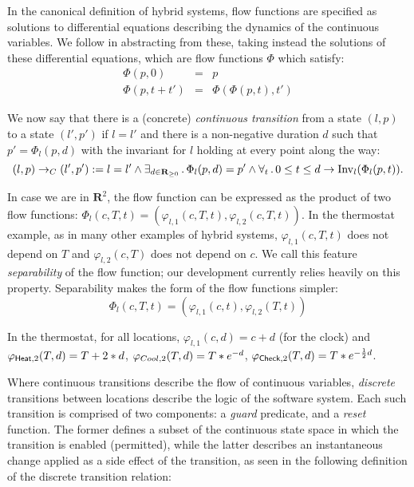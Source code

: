 \documentclass[runningheads]{llncs}
\newcommand{\Exists}[2]{\exists_{#1} \, . \, #2}
\newcommand{\Forall}[2]{\forall_{#1} \, . \, #2}
\def\phi{\varphi}
\newcommand{\weg}[1]{}
\newcommand{\IR}{{\mathbf R}}
\newcommand{\Heat}{{\sf Heat}}
\newcommand{\Cool}{{\sf Cool}}
\newcommand{\Chec}{{\sf Check}}
\newcommand{\Inv}{{\rm Inv}}
\newcommand{\contrans}{\rightarrow_C}
\newcommand{\Dur}{{\IR_{\geq 0}}}
\begin{document}

In the canonical definition of hybrid systems, flow functions are
specified as solutions to differential equations describing the
dynamics of the continuous variables. We follow \cite{alur} in
abstracting from these, taking instead the solutions of these
differential equations, which are flow functions $\Phi$ which satisfy:
\begin{eqnarray*}
  \Phi( p, 0) &=& p \\
  \Phi (p, t + t') &=& \Phi (\Phi( p, t), t')
\end{eqnarray*}
\weg{
We further require that $\Phi$ is a morphism respecting |Point|'s
setoid equality. We bundle functions with these properties as a record
type called |Flow| (not shown), which is parametrized over the
continuous state space type, and is equipped with an implicit coercion
to the |phi| function it contains.
\todo{Unlike Alur, we don't have ``input'' (why?).}
}

We now say that there is a (concrete) \emph{continuous transition}
from a state $(l, p)$ to a state $(l', p')$ if $l = l'$ and there is a
non-negative duration $d$ such that $p' = \Phi_l( p,d)$ with the
invariant for $l$ holding at every point along the way:
$$ (l,p) \contrans (l',p') := l=l' \wedge \Exists{d\in
\Dur}{\Phi_l(p, d) = p' \wedge \Forall{t}{0 \leq t\leq d \rightarrow
\Inv_l(\Phi_l (p, t))}}.$$

In case we are in $\IR ^2$, the flow function can be expressed as the
product of two flow functions: $\Phi_l(c,T,t) = (\phi_{l,1}(c,T,t),
\phi_{l,2}(c,T,t))$. In the thermostat example, as in many other
examples of hybrid systems, $\phi_{l,1}(c,T,t)$ does not depend on $T$
and $\phi_{l,2}(c,T)$ does not depend on $c$. We call this feature
{\em separability\/} of the flow function; our development currently
relies heavily on this property. Separability makes the form of the
flow functions simpler:
$$\Phi_l(c,T,t) = (\phi_{l,1}(c,t), \phi_{l,2}(T,t))$$

In the thermostat, for all locations, $\phi_{l,1}(c,d) = c + d$ (for
the clock) and $\phi_{\Heat,2}(T,d)= T + 2 * d$,
$\phi_{\\Cool,2}(T,d)= T * e^{-d}$, $\phi_{\Chec,2}(T,d)= T * e^{-
  \frac{1}{2}d}$.

Where continuous transitions describe the flow of continuous
variables, \emph{discrete} transitions between locations describe the
logic of the software system. Each such transition is comprised of two
components: a \emph{guard} predicate, and a \emph{reset} function. The
former defines a subset of the continuous state space in which the
transition is enabled (permitted), while the latter describes an
instantaneous change applied as a side effect of the transition, as
seen in the following definition of the discrete transition relation:
\end{document}
